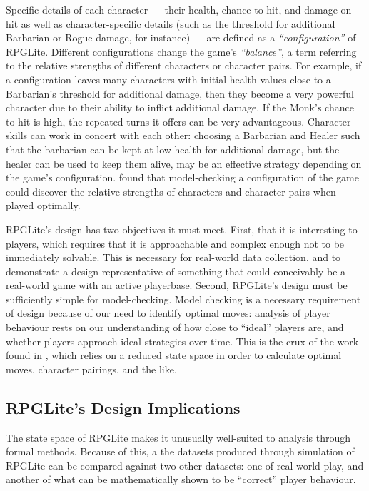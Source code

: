 Specific details of each character --- their health, chance to hit, and damage
on hit as well as character-specific details (such as the threshold for
additional Barbarian or Rogue damage, for instance) --- are defined as a
\emph{``configuration''} of RPGLite. Different configurations change the game's
\emph{``balance''}, a term referring to the relative strengths of different
characters or character pairs. For example, if a configuration leaves many
characters with initial health values close to a Barbarian's threshold for
additional damage, then they become a very powerful character due to their
ability to inflict additional damage. If the Monk's chance to hit is high, the
repeated turns it offers can be very advantageous. Character skills can work in
concert with each other: choosing a Barbarian and Healer such that the barbarian
can be kept at low health for additional damage, but the healer can be used to
keep them alive, may be an effective strategy depending on the game's
configuration. \citeauthor{kavanagh2020} found that model-checking a
configuration of the game could discover the relative strengths of characters
and character pairs when played optimally.

RPGLite's design has two objectives it must meet. First, that it is interesting
to players, which requires that it is approachable and complex enough not to be
immediately solvable. This is necessary for real-world data collection, and to
demonstrate a design representative of something that could conceivably be a
real-world game with an active playerbase. Second, RPGLite's design must be
sufficiently simple for model-checking. Model checking is a necessary
requirement of design because of our need to identify optimal moves: analysis of
player behaviour rests on our understanding of how close to ``ideal'' players
are, and whether players approach ideal strategies over time. This is the crux
of the work found in \cite{}, which relies on a reduced state space in order to calculate
optimal moves, character pairings, and the like.

\subsection{RPGLite's Design Implications}

The state space of RPGLite makes it unusually well-suited to analysis through
formal methods.  Because of this, a the datasets produced through simulation of
RPGLite can be compared against two other datasets: one of real-world play, and
another of what can be mathematically shown to be ``correct'' player behaviour.

